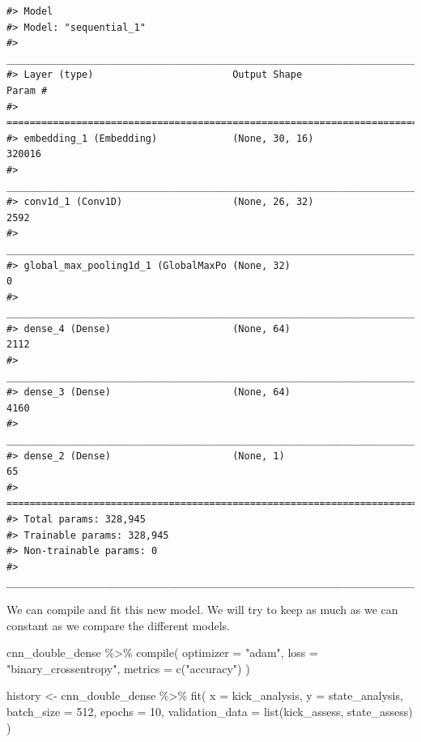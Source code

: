 \documentclass[
]{krantz}
\makeatletter
\newenvironment{Shaded}{\begin{snugshade}}{\end{snugshade}}
\newcommand{\AttributeTok}[1]{\textcolor[rgb]{0.77,0.63,0.00}{#1}}
\newcommand{\DecValTok}[1]{\textcolor[rgb]{0.00,0.00,0.81}{#1}}
\newcommand{\FunctionTok}[1]{\textcolor[rgb]{0.00,0.00,0.00}{#1}}
\newcommand{\NormalTok}[1]{#1}
\newcommand{\OtherTok}[1]{\textcolor[rgb]{0.56,0.35,0.01}{#1}}
\newcommand{\SpecialCharTok}[1]{\textcolor[rgb]{0.00,0.00,0.00}{#1}}
\newcommand{\StringTok}[1]{\textcolor[rgb]{0.31,0.60,0.02}{#1}}
\newenvironment{kframe}{%
\medskip{}
\setlength{\fboxsep}{.8em}
 \def\at@end@of@kframe{}%
 \ifinner\ifhmode%
  \def\at@end@of@kframe{\end{minipage}}%
  \begin{minipage}{\columnwidth}%
 \fi\fi%
 \def\FrameCommand##1{\hskip\@totalleftmargin \hskip-\fboxsep
 \colorbox{shadecolor}{##1}\hskip-\fboxsep
     \hskip-\linewidth \hskip-\@totalleftmargin \hskip\columnwidth}%
 \MakeFramed {\advance\hsize-\width
   \@totalleftmargin\z@ \linewidth\hsize
   \@setminipage}}%
 {\par\unskip\endMakeFramed%
 \at@end@of@kframe}
\renewenvironment{Shaded}{\begin{kframe}}{\end{kframe}}
\makeatother
\begin{document}
\begin{verbatim}
#> Model
#> Model: "sequential_1"
#> ________________________________________________________________________________
#> Layer (type)                        Output Shape                    Param #     
#> ================================================================================
#> embedding_1 (Embedding)             (None, 30, 16)                  320016      
#> ________________________________________________________________________________
#> conv1d_1 (Conv1D)                   (None, 26, 32)                  2592        
#> ________________________________________________________________________________
#> global_max_pooling1d_1 (GlobalMaxPo (None, 32)                      0           
#> ________________________________________________________________________________
#> dense_4 (Dense)                     (None, 64)                      2112        
#> ________________________________________________________________________________
#> dense_3 (Dense)                     (None, 64)                      4160        
#> ________________________________________________________________________________
#> dense_2 (Dense)                     (None, 1)                       65          
#> ================================================================================
#> Total params: 328,945
#> Trainable params: 328,945
#> Non-trainable params: 0
#> ________________________________________________________________________________
\end{verbatim}

We can compile and fit this new model. We will try to keep as much as we can constant as we compare the different models.

\begin{Shaded}
\begin{Highlighting}[]
\NormalTok{cnn\_double\_dense }\SpecialCharTok{\%\textgreater{}\%} \FunctionTok{compile}\NormalTok{(}
  \AttributeTok{optimizer =} \StringTok{"adam"}\NormalTok{,}
  \AttributeTok{loss =} \StringTok{"binary\_crossentropy"}\NormalTok{,}
  \AttributeTok{metrics =} \FunctionTok{c}\NormalTok{(}\StringTok{"accuracy"}\NormalTok{)}
\NormalTok{)}

\NormalTok{history }\OtherTok{\textless{}{-}}\NormalTok{ cnn\_double\_dense }\SpecialCharTok{\%\textgreater{}\%} \FunctionTok{fit}\NormalTok{(}
  \AttributeTok{x =}\NormalTok{ kick\_analysis,}
  \AttributeTok{y =}\NormalTok{ state\_analysis,}
  \AttributeTok{batch\_size =} \DecValTok{512}\NormalTok{,}
  \AttributeTok{epochs =} \DecValTok{10}\NormalTok{,}
  \AttributeTok{validation\_data =} \FunctionTok{list}\NormalTok{(kick\_assess, state\_assess)}
\NormalTok{)}
\end{Highlighting}
\end{Shaded}
\end{document}
